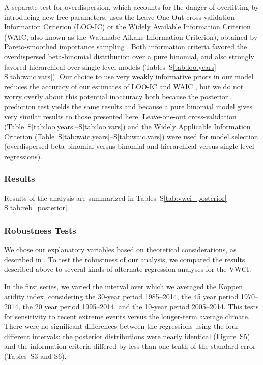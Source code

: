 \documentclass[draft]{agujournal}\usepackage{knitr}
\begin{document}
A separate test for overdispersion, which accounts for the danger of overfitting
by introducing new free parameters, uses the
Leave-One-Out cross-validation Information Criterion (LOO-IC)
or the
Widely Available Information Criterion (WAIC, also known as the
Watanabe-Aikake Information Criterion),
obtained by Pareto-smoothed importance sampling \citep{vehtari:loo:2016}.
Both information criteria favored the overdispersed beta-binomial distribution
over a pure binomial, and also strongly favored hierarchical over single-level
models (Tables~S\ref{tab:loo.years}--S\ref{tab:waic.vars}).
Our choice to use very weakly informative priors in our model reduces the
accuracy of our estimates of LOO-IC and WAIC \citep{vehtari:loo:2016},
but we do not worry overly about this potential inaccuracy both because the
posterior prediction test yields the same results and because a pure binomial
model gives very similar results to those presented here.
\else
Leave-one-out cross-validation (Table~S\ref{tab:loo.years}--S\ref{tab:loo.vars})
and the Widely Applicable Information Criterion
(Table~S\ref{tab:waic.years}--S\ref{tab:waic.vars}) were used for model selection
(overdispersed beta-binomial versus binomial and hierarchical versus single-level
regressions).
\fi

\subsubsection*{Results}

Results of the analysis are summarized in
Tables~S\ref{tab:vwci_posterior}--S\ref{tab:reb_posterior}.

\subsubsection*{Robustness Tests}
We chose our explanatory variables based on theoretical considerations, as
described in \citet{hess:drought:2016}. To test the robustness of our analysis,
we compared the results described above to several kinds of alternate regression
analyses for the VWCI.

In the first series, we varied the interval over which we averaged
the K\"oppen aridity index, considering the 30-year period 1985--2014,
the 45 year period 1970--2014,
the 20 year period 1995--2014, and the 10-year period 2005--2014. This tests
for sensitivity to recent extreme events versus the longer-term average
climate.
There were no significant differences between the regressions using the
four different intervals: the posterior distributions were nearly identical
(Figure~S5) and the information criteria differed by less than one tenth
of the standard error (Tables~S3 and S6).
\end{document}

